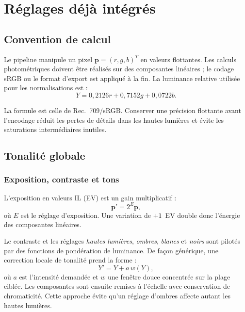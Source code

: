\chapter{Réglages déjà intégrés}
\label{chap:reglages-existants}

\section{Convention de calcul}

Le pipeline manipule un pixel $\mathbf{p}=(r,g,b)^T$ en valeurs flottantes. Les calculs photométriques doivent être réalisés sur des composantes linéaires ; le codage sRGB ou le format d'export est appliqué à la fin. La luminance relative utilisée pour les normalisations est :
\begin{equation}
  Y = 0{,}2126r + 0{,}7152g + 0{,}0722b.
\end{equation}

La formule est celle de Rec.~709/sRGB. Conserver une précision flottante avant l'encodage réduit les pertes de détails dans les hautes lumières et évite les saturations intermédiaires inutiles.

\section{Tonalité globale}

\subsection{Exposition, contraste et tons}

L'exposition en valeurs IL (EV) est un gain multiplicatif :
\begin{equation}
  \mathbf{p}' = 2^{E}\mathbf{p},
\end{equation}
où $E$ est le réglage d'exposition. Une variation de $+1$~EV double donc l'énergie des composantes linéaires.

Le contraste et les réglages \emph{hautes lumières}, \emph{ombres}, \emph{blancs} et \emph{noirs} sont pilotés par des fonctions de pondération de luminance. De façon générique, une correction locale de tonalité prend la forme :
\begin{equation}
  Y' = Y + a\,w(Y),
\end{equation}
où $a$ est l'intensité demandée et $w$ une fenêtre douce concentrée sur la plage ciblée. Les composantes sont ensuite remises à l'échelle avec conservation de chromaticité. Cette approche évite qu'un réglage d'ombres affecte autant les hautes lumières.

